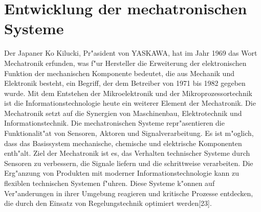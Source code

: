 \section{Entwicklung der mechatronischen Systeme}

Der Japaner Ko Kilucki, 
Pr"asident von YASKAWA, 
hat im Jahr 1969 das Wort Mechatronik erfunden, 
was f"ur Hersteller die Erweiterung der 
elektronischen Funktion der mechanischen Komponente bedeutet, 
die aus Mechanik und Elektronik besteht, ein Begriff, 
der dem Betreiber von 1971 bis 1982 gegeben wurde. 
Mit dem Entstehen der Mikroelektronik und der Mikroprozessortechnik 
ist die Informationstechnologie heute ein weiterer 
Element der Mechatronik. 
Die Mechatronik setzt auf die Synergien von Maschinenbau, 
Elektrotechnik und Informationstechnik. 
Die mechatronischen Systeme repr"asentieren die 
Funktionalit"at von Sensoren, Aktoren und Signalverarbeitung. 
Es ist m"oglich, dass das Basissystem mechanische, 
chemische und elektrische Komponenten enth"alt. 
Ziel der Mechatronik ist es, das Verhalten technischer Systeme 
durch Sensoren zu verbessern, 
die Signale liefern und die schrittweise verarbeiten. 
Die Erg"anzung von Produkten mit moderner Informationstechnologie 
kann zu flexiblen technischen Systemen f"uhren. 
Diese Systeme k"onnen auf Ver"anderungen in ihrer Umgebung 
reagieren und kritische Prozesse entdecken, 
die durch den Einsatz von Regelungstechnik optimiert werden[23].

